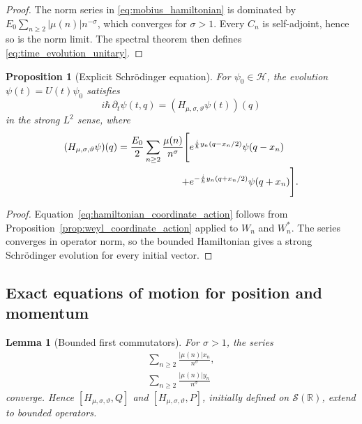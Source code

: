 \documentclass[11pt]{amsart}
\numberwithin{equation}{section}
\theoremstyle{plain}
\newtheorem{proposition}[theorem]{Proposition}
\newtheorem{lemma}[theorem]{Lemma}
\theoremstyle{definition}
\theoremstyle{remark}
\newcommand{\R}{\mathbb{R}}
\newcommand{\Hil}{\mathcal{H}}
\newcommand{\Sch}{\mathcal{S}}
\begin{document}
\begin{proof}
The norm series in \eqref{eq:mobius_hamiltonian} is dominated by
$E_0\sum_{n\ge2}|\mu(n)|n^{-\sigma}$, which converges for $\sigma>1$.
Every $C_n$ is self-adjoint, hence so is the norm limit.  The spectral theorem
then defines \eqref{eq:time_evolution_unitary}.
\end{proof}

\begin{proposition}[Explicit Schr\"odinger equation]
\label{prop:schrodinger_equation}
For $\psi_0\in\Hil$, the evolution $\psi(t)=U(t)\psi_0$ satisfies
\begin{equation}
i\hbar\,\partial_t\psi(t,q)
=
(H_{\mu,\sigma,\vartheta}\psi(t))(q)
\label{eq:schrodinger_equation}
\end{equation}
in the strong $L^2$ sense, where
\begin{align}
(H_{\mu,\sigma,\vartheta}\psi)(q)
=
\frac{E_0}{2}
\sum_{n\ge2}
\frac{\mu(n)}{n^{\sigma}}
\Bigg[
& e^{\frac{i}{\hbar}y_n(q-x_n/2)}\psi(q-x_n)
\notag\\
+{}&e^{-\frac{i}{\hbar}y_n(q+x_n/2)}\psi(q+x_n)
\Bigg].
\label{eq:hamiltonian_coordinate_action}
\end{align}
\end{proposition}

\begin{proof}
Equation~\eqref{eq:hamiltonian_coordinate_action} follows from
Proposition~\ref{prop:weyl_coordinate_action} applied to $W_n$ and $W_n^*$.
The series converges in operator norm, so the bounded Hamiltonian gives a
strong Schr\"odinger evolution for every initial vector.
\end{proof}

\subsection{Exact equations of motion for position and momentum}
\label{subsec:equations_of_motion}

\begin{lemma}[Bounded first commutators]
\label{lem:bounded_first_commutators}
For $\sigma>1$, the series
\begin{align}
\sum_{n\ge2}
\frac{|\mu(n)|x_n}{n^{\sigma}},
\label{eq:x_commutator_sum}\\
\sum_{n\ge2}
\frac{|\mu(n)|y_n}{n^{\sigma}}
\label{eq:y_commutator_sum}
\end{align}
converge.  Hence $[H_{\mu,\sigma,\vartheta},Q]$ and
$[H_{\mu,\sigma,\vartheta},P]$, initially defined on $\Sch(\R)$, extend to
bounded operators.
\end{lemma}
\end{document}
